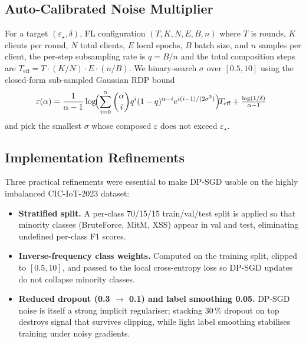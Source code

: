 \documentclass[conference]{IEEEtran}
\newcommand{\eps}{\varepsilon}
\begin{document}
\subsection{Auto-Calibrated Noise Multiplier}\label{sec:calibrator}
For a target $(\eps_{\star},\delta)$, FL configuration
$(T, K, N, E, B, n)$ where $T$ is rounds, $K$ clients per round, $N$
total clients, $E$ local epochs, $B$ batch size, and $n$ samples per
client, the per-step subsampling rate is $q=B/n$ and the total
composition steps are $T_{\text{eff}}=T\cdot(K/N)\cdot E\cdot(n/B)$.
We binary-search $\sigma$ over $[0.5,10]$ using the closed-form
sub-sampled Gaussian RDP bound
\begin{equation}
\!\!\!\eps(\alpha)
=\frac{1}{\alpha-1}\log\!\Bigl(
  \sum_{i=0}^{\alpha}\binom{\alpha}{i}q^{i}(1-q)^{\alpha-i}
  e^{i(i-1)/(2\sigma^{2})}\Bigr)
\!T_{\text{eff}} + \tfrac{\log(1/\delta)}{\alpha-1}
\end{equation}
and pick the smallest $\sigma$ whose composed $\eps$ does not exceed
$\eps_{\star}$.

\subsection{Implementation Refinements}\label{sec:tricks}
Three practical refinements were essential to make DP-SGD usable on
the highly imbalanced CIC-IoT-2023 dataset:
\begin{itemize}
\item \textbf{Stratified split.} A per-class 70/15/15 train/val/test
      split is applied so that minority classes (BruteForce, MitM,
      XSS) appear in val and test, eliminating undefined per-class F1
      scores.
\item \textbf{Inverse-frequency class weights.} Computed on the
      training split, clipped to $[0.5,10]$, and passed to the local
      cross-entropy loss so DP-SGD updates do not collapse minority
      classes.
\item \textbf{Reduced dropout (0.3 $\rightarrow$ 0.1) and label
      smoothing 0.05.} DP-SGD noise is itself a strong implicit
      regulariser; stacking 30\,\% dropout on top destroys signal
      that survives clipping, while light label smoothing stabilises
      training under noisy gradients.
\end{itemize}
\end{document}
